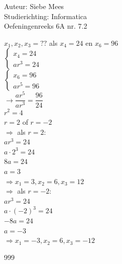 \documentclass[a4paper]{article}
\begin{document}
  
\noindent \large Auteur: Siebe Mees \\
\noindent \large Studierichting: Informatica\\
\noindent \large Oefeningenreeks 6A nr. 7.2\\

\medskip

\normalsize

$x_1, x_2, x_3 = ?? $ als $ x_4 = 24 $ en $ x_6 = 96$\\

$ \left \{
\begin{array}{l}
x_4 = 24\\
ar^3 = 24
\end{array}
\right .$\\

$ \left \{
\begin{array}{l}
x_6 = 96\\
ar^5 = 96
\end{array}
\right .$\\

$\rightarrow \dfrac{ar^5}{ar^3} = \dfrac{96}{24}$\\

$r^2 = 4$\\

$r = 2 $ of $ r = -2$\\

$\Rightarrow $ als $ r = 2:$\\

$ar^3 = 24$\\

$a \cdot 2^3 = 24$\\

$8a = 24$\\

$a = 3$\\

$\Rightarrow x_1 = 3, x_2 = 6, x_3 = 12$\\

$\Rightarrow $ als $ r = -2:$\\

$ar^3 = 24$\\

$a \cdot (-2)^3 = 24$\\

$-8a = 24$\\

$a = -3$\\

$\Rightarrow x_1 = -3, x_2 = 6, x_3 = -12$\\

\begin{thebibliography}{999}
\end{thebibliography}
\end{document}
